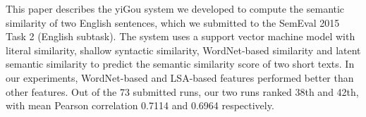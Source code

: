 This paper describes the yiGou system we developed to compute the semantic similarity of two English sentences, which we submitted to the SemEval 2015 Task 2 (English subtask). The system uses a support vector machine model with literal similarity, shallow syntactic similarity, WordNet-based similarity and latent semantic similarity to predict the semantic similarity score of two short texts. In our experiments, WordNet-based and LSA-based features performed better than other features. Out of the 73 submitted runs, our two runs ranked 38th and 42th, with mean Pearson correlation 0.7114 and 0.6964 respectively.
